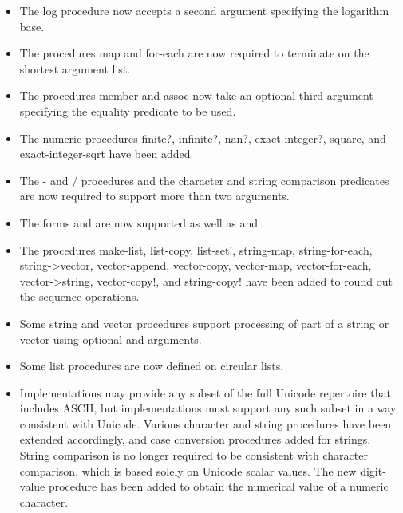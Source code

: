 \begin{itemize}
\item The {\cf log} procedure now accepts a second argument specifying
the logarithm base.

\item The procedures {\cf map} and {\cf for-each} are now required to terminate on
the shortest argument list.

\item The procedures {\cf member} and {\cf assoc} now take an optional third argument
specifying the equality predicate to be used.

\item The numeric procedures {\cf finite?}, {\cf infinite?}, {\cf nan?},
{\cf exact-integer?}, {\cf square}, and {\cf exact-integer-sqrt}
have been added.

\item The {\cf -} and {\cf /} procedures
and the character and string comparison
predicates are now required to support more than two arguments.

\item The forms \sharptrue{} and \sharpfalse{} are now supported
as well as \schtrue{} and \schfalse{}.

\item The procedures {\cf make-list}, {\cf list-copy}, {\cf list-set!},
{\cf string-map}, {\cf string-for-each}, {\cf string->vector}, 
{\cf vector-append},
{\cf vector-copy}, {\cf vector-map}, {\cf vector-for-each}, 
{\cf vector->string}, {\cf vector-copy!}, and {\cf string-copy!}
have been added to round out the sequence operations.

\item Some string and vector procedures support processing of part of a string or vector using
optional  and  arguments.

\item Some list procedures are now defined on circular lists.

\item Implementations may provide any subset of the full Unicode
repertoire that includes ASCII, but implementations must support any
such subset in a way consistent with Unicode.
Various character and string procedures have been extended accordingly,
and case conversion procedures added for strings.
String comparison is no longer
required to be consistent with character comparison, which is based
solely on Unicode scalar values.
The new {\cf digit-value} procedure has been added to obtain the numerical
value of a numeric character.


\end{itemize}
